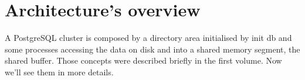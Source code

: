 \chapter{Architecture's overview}
A PostgreSQL cluster is composed by a directory area initialised by init db and some processes 
accessing the data on disk and into a shared memory segment, the shared buffer. Those concepts were 
described briefly in the first volume. Now we'll see them in more details.




